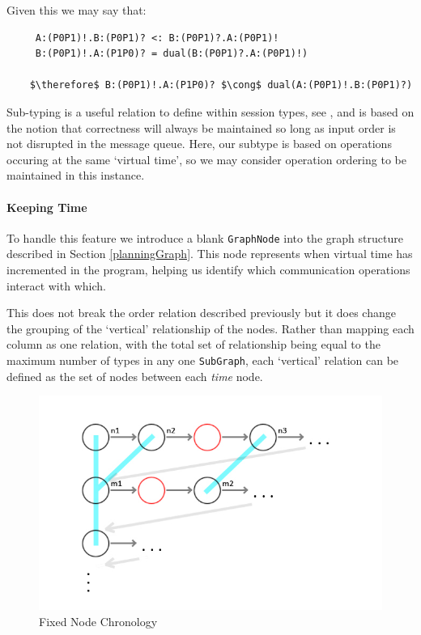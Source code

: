 \documentclass[11pt, abstracton, twoside, titlepage=true]{scrartcl}
\def\therefore{
	\leavevmode
	\lower0.4ex\hbox{$\cdot$}
	\kern-.5em\raise0.7ex\hbox{$\cdot$}
	\kern-0.55em\lower0.4ex\hbox{$\cdot$}
	\thinspace
}
\begin{document}
Given this we may say that:
\\
\begin{lstlisting}
     A:(P0P1)!.B:(P0P1)? <: B:(P0P1)?.A:(P0P1)!
     B:(P0P1)!.A:(P1P0)? = dual(B:(P0P1)?.A:(P0P1)!)

    $\therefore$ B:(P0P1)!.A:(P1P0)? $\cong$ dual(A:(P0P1)!.B:(P0P1)?)
\end{lstlisting}

Sub-typing is a useful relation to define within session types, see 
\cite{HYC08, MY15, MYH09}, and is based on the notion that correctness will 
always be maintained so long as input order is not disrupted in the message 
queue. Here, our subtype is based on operations occuring at the same `virtual 
time', so we may consider operation ordering to be maintained in this instance. 


\paragraph{Keeping Time}
To handle this feature we introduce a blank \texttt{GraphNode} into the graph 
structure described in Section \ref{planningGraph}. This node represents when virtual 
time has incremented in the program, helping us identify which communication 
operations interact with which.

This does not break the order relation
described previously but it does change the grouping of the `vertical' 
relationship of the nodes. Rather than mapping each column as one relation, with
the total set of relationship being equal to the maximum number of types in
any one \texttt{SubGraph}, each `vertical' relation can be defined as the
set of nodes between each \emph{time} node.

\begin{figure}[h!]
	\centering
	\includegraphics[width=\textwidth]{images/GraphTwo.jpg}
	\caption{Fixed Node Chronology} \label{graphTwo}
\end{figure}
\end{document}
